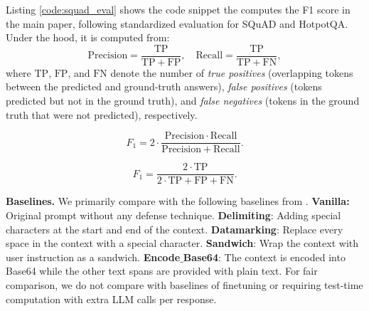 \documentclass[11pt]{article}
\begin{document}
Listing  \ref{code:squad_eval} shows the code snippet the computes the F1 score in the main paper, following standardized evaluation for SQuAD and HotpotQA. Under the hood, it is computed from:
\[
\mathrm{Precision} = \frac{\mathrm{TP}}{\mathrm{TP} + \mathrm{FP}}, 
\quad
\mathrm{Recall} = \frac{\mathrm{TP}}{\mathrm{TP} + \mathrm{FN}},
\]
where \(\mathrm{TP}\), \(\mathrm{FP}\), and \(\mathrm{FN}\) denote the number of \textit{true positives} (overlapping tokens between the predicted and ground-truth answers), \textit{false positives} (tokens predicted but not in the ground truth), and \textit{false negatives} (tokens in the ground truth that were not predicted), respectively.


\[
F_1 = 2 \cdot \frac{\mathrm{Precision} \cdot \mathrm{Recall}}{\mathrm{Precision} + \mathrm{Recall}}.
\]

\[
F_1 = \frac{2 \cdot \mathrm{TP}}{2 \cdot \mathrm{TP} + \mathrm{FP} + \mathrm{FN}}.
\]





    



\vspace{1mm}
\noindent\textbf{Baselines.}
We primarily compare with the following baselines from \cite{wu2023defending, hines2024defending, schulhoff2023ignore}. \textbf{Vanilla:} Original prompt without any defense technique. \textbf{Delimiting}: Adding special characters at the start and end of the context.
\textbf{Datamarking}: Replace every space in the context with a special character.
\textbf{Sandwich}: Wrap the context with user instruction as a sandwich.
\textbf{Encode$\_$Base64}: The context is encoded into Base64 while the other text spans are provided with plain text.
For fair comparison, we do not compare with baselines of finetuning or requiring test-time computation with extra LLM calls per response.
\end{document}
